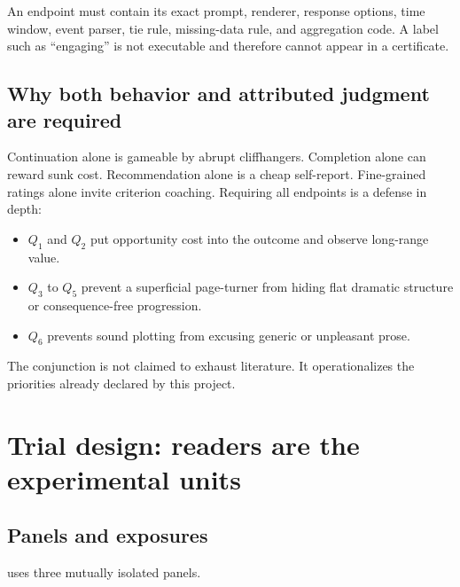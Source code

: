 \documentclass[11pt]{article}
\theoremstyle{remark}
\newcommand{\code}[1]{\texttt{\detokenize{#1}}}
\begin{document}
An endpoint must contain its exact prompt, renderer, response options, time window, event
parser, tie rule, missing-data rule, and aggregation code. A label such as ``engaging'' is
not executable and therefore cannot appear in a certificate.

\subsection{Why both behavior and attributed judgment are required}

Continuation alone is gameable by abrupt cliffhangers. Completion alone can reward sunk
cost. Recommendation alone is a cheap self-report. Fine-grained ratings alone invite
criterion coaching. Requiring all endpoints is a defense in depth:

\begin{itemize}
  \item $Q_1$ and $Q_2$ put opportunity cost into the outcome and observe long-range value.
  \item $Q_3$ to $Q_5$ prevent a superficial page-turner from hiding flat dramatic
  structure or consequence-free progression.
  \item $Q_6$ prevents sound plotting from excusing generic or unpleasant prose.
\end{itemize}

The conjunction is not claimed to exhaust literature. It operationalizes the priorities
already declared by this project.

\section{Trial design: readers are the experimental units}

\subsection{Panels and exposures}

\code{BOOK-GOOD-v1} uses three mutually isolated panels.
\end{document}
